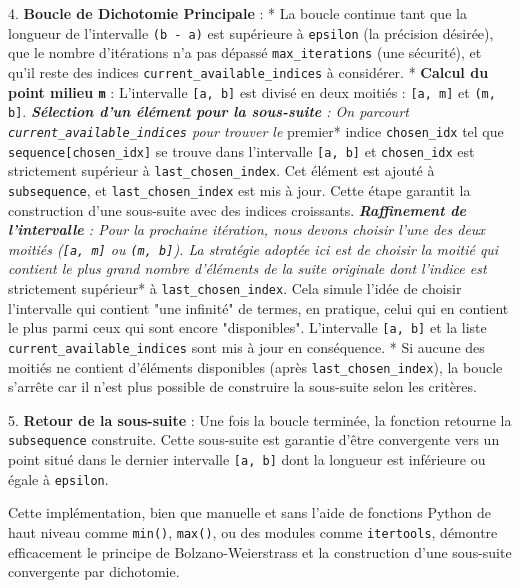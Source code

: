 \documentclass{report}
\begin{document}
4.  \textbf{Boucle de Dichotomie Principale} :
    *   La boucle continue tant que la longueur de l'intervalle \texttt{(b - a)} est supérieure à \texttt{epsilon} (la précision désirée), que le nombre d'itérations n'a pas dépassé \texttt{max\_iterations} (une sécurité), et qu'il reste des indices \texttt{current\_available\_indices} à considérer.
    *   \textbf{Calcul du point milieu \texttt{m}} : L'intervalle \texttt{[a, b]} est divisé en deux moitiés : \texttt{[a, m]} et \texttt{(m, b]}.
    \textit{   \textbf{Sélection d'un élément pour la sous-suite} : On parcourt \texttt{current\_available\_indices} pour trouver le }premier* indice \texttt{chosen\_idx} tel que \texttt{sequence[chosen\_idx]} se trouve dans l'intervalle \texttt{[a, b]} et \texttt{chosen\_idx} est strictement supérieur à \texttt{last\_chosen\_index}. Cet élément est ajouté à \texttt{subsequence}, et \texttt{last\_chosen\_index} est mis à jour. Cette étape garantit la construction d'une sous-suite avec des indices croissants.
    \textit{   \textbf{Raffinement de l'intervalle} : Pour la prochaine itération, nous devons choisir l'une des deux moitiés (\texttt{[a, m]} ou \texttt{(m, b]}). La stratégie adoptée ici est de choisir la moitié qui contient le plus grand nombre d'éléments de la suite originale dont l'indice est }strictement supérieur* à \texttt{last\_chosen\_index}. Cela simule l'idée de choisir l'intervalle qui contient "une infinité" de termes, en pratique, celui qui en contient le plus parmi ceux qui sont encore "disponibles". L'intervalle \texttt{[a, b]} et la liste \texttt{current\_available\_indices} sont mis à jour en conséquence.
    *   Si aucune des moitiés ne contient d'éléments disponibles (après \texttt{last\_chosen\_index}), la boucle s'arrête car il n'est plus possible de construire la sous-suite selon les critères.

5.  \textbf{Retour de la sous-suite} : Une fois la boucle terminée, la fonction retourne la \texttt{subsequence} construite. Cette sous-suite est garantie d'être convergente vers un point situé dans le dernier intervalle \texttt{[a, b]} dont la longueur est inférieure ou égale à \texttt{epsilon}.

Cette implémentation, bien que manuelle et sans l'aide de fonctions Python de haut niveau comme \texttt{min()}, \texttt{max()}, ou des modules comme \texttt{itertools}, démontre efficacement le principe de Bolzano-Weierstrass et la construction d'une sous-suite convergente par dichotomie.

\newpage
\end{document}

